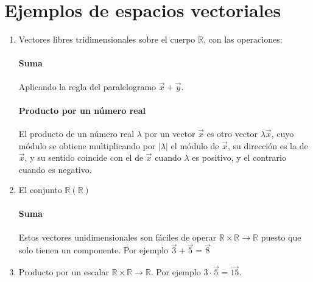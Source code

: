 \section{Ejemplos de espacios vectoriales}
\begin{enumerate}
	\item Vectores libres tridimensionales sobre el cuerpo $\mathbb{R}$, con las operaciones:
		\paragraph{Suma} Aplicando la regla del paralelogramo $\vec{x}+\vec{y}$.
		\paragraph{Producto por un número real} El producto de un número real $\lambda$ por un
		vector $\vec{x}$ es otro vector $\lambda\vec{x}$, cuyo módulo se obtiene multiplicando por
		$|\lambda|$ el módulo de $\vec{x}$, su dirección es la de $\vec{x}$, y su sentido coincide
		con el de $\vec{x}$ cuando $\lambda$ es positivo, y el contrario cuando es negativo.
	\item El conjunto $\mathbb{R}(\mathbb{R})$
		\paragraph{Suma} Estos vectores unidimensionales son fáciles de operar
		$\mathbb{R}\times\mathbb{R}\rightarrow\mathbb{R}$ puesto que solo tienen un componente. Por
		ejemplo $\vec{3}+\vec{5}=\vec{8}$
	\item Producto por un escalar $\mathbb{R}\times\mathbb{R}\rightarrow\mathbb{R}$. Por ejemplo
		$3\cdot\vec{5}=\vec{15}$.
\end{enumerate}

